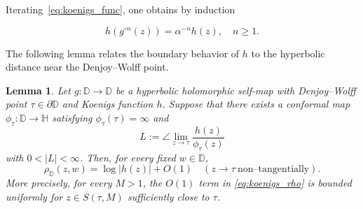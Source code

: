 \documentclass[10pt,a4paper]{amsart}
\numberwithin{equation}{section}
\newtheorem{lemma}[equation]{Lemma}
\begin{document}
Iterating~\eqref{eq:koenigs_func}, one obtains by induction

\begin{equation*}
h(g^{\circ n}(z))
=
\alpha^{-n}h(z),
\quad n\ge1.
\end{equation*}



The following lemma relates the boundary behavior of $h$ to the hyperbolic distance near the Denjoy--Wolff point.

\begin{lemma}
\label{lem:koenigs_metric}
Let $g:\mathbb{D}\to\mathbb{D}$ be a hyperbolic holomorphic
self-map with Denjoy--Wolff point $\tau\in\partial\mathbb{D}$ and
Koenigs function $h$. Suppose that there exists a conformal map
$\phi_\tau:\mathbb{D}\to\mathbb{H}$ satisfying
$\phi_\tau(\tau)=\infty$ and
\begin{equation*}
\label{eq:koenigs_angular}
L:=\angle\lim_{z\to\tau}
\frac{h(z)}{\phi_\tau(z)}
\end{equation*}
with $0<|L|<\infty$. Then, for every fixed $w\in\mathbb{D}$,
\begin{equation}
\label{eq:koenigs_rho}
\rho_{\mathbb{D}}(z,w)
=
\log|h(z)|+O(1)
\quad
(z\to\tau\ \text{non--tangentially}).
\end{equation}
More precisely, for every $M>1$, the $O(1)$ term in
\eqref{eq:koenigs_rho} is bounded uniformly for
$z\in S(\tau,M)$ sufficiently close to $\tau$.
\end{lemma}
\end{document}
